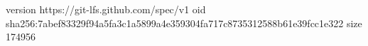 version https://git-lfs.github.com/spec/v1
oid sha256:7abef83329f94a5fa3c1a5899a4e359304fa717c8735312588b61e39fcc1e322
size 174956
